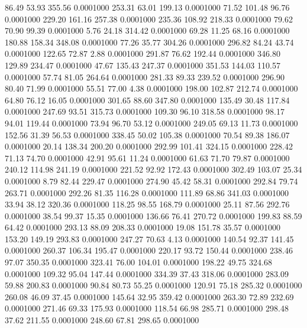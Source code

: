   86.49   53.93  355.56   0.0001000
 253.31   63.01  199.13   0.0001000
  71.52  101.48   96.76   0.0001000
 229.20  161.16  257.38   0.0001000
 235.36  108.92  218.33   0.0001000
  79.62   70.90   99.39   0.0001000
   5.76   24.18  314.42   0.0001000
  69.28   11.25   68.16   0.0001000
 180.88  158.34  348.08   0.0001000
  77.26   35.77  304.26   0.0001000
 296.82   84.24   43.74   0.0001000
 122.65   72.87    2.88   0.0001000
 291.87   76.62  192.44   0.0001000
 346.80  129.89  234.47   0.0001000
  47.67  135.43  247.37   0.0001000
 351.53  144.03  110.57   0.0001000
  57.74   81.05  264.64   0.0001000
 281.33   89.33  239.52   0.0001000
 296.90   80.40   71.99   0.0001000
  55.51   77.00    4.38   0.0001000
 198.00  102.87  212.74   0.0001000
  64.80   76.12   16.05   0.0001000
 301.65   88.60  347.80   0.0001000
 135.49   30.48  117.84   0.0001000
 247.69   93.51  315.73   0.0001000
 109.30   96.10  318.58   0.0001000
  98.17   94.01  119.44   0.0001000
  73.94   96.70   53.12   0.0001000
 249.05   69.13   11.73   0.0001000
 152.56   31.39   56.53   0.0001000
 338.45   50.02  105.38   0.0001000
  70.54   89.38  186.07   0.0001000
  20.14  138.34  200.20   0.0001000
 292.99  101.41  324.15   0.0001000
 228.42   71.13   74.70   0.0001000
  42.91   95.61   11.24   0.0001000
  61.63   71.70   79.87   0.0001000
 240.12  114.98  241.19   0.0001000
 221.52   92.92  172.43   0.0001000
 302.49  103.07   25.34   0.0001000
   8.79   82.44  229.47   0.0001000
 274.90   45.42   58.31   0.0001000
 292.84   79.74  263.71   0.0001000
 292.26   81.35  116.28   0.0001000
 111.89   68.86  341.03   0.0001000
  33.94   38.12  320.36   0.0001000
 118.25   98.55  168.79   0.0001000
  25.11   87.56  292.76   0.0001000
  38.54   99.37   15.35   0.0001000
 136.66   76.41  270.72   0.0001000
 199.83   88.59   64.42   0.0001000
 293.13   88.09  208.33   0.0001000
  19.08  151.78   35.57   0.0001000
 153.20  149.19  293.83   0.0001000
 247.27   70.63    4.13   0.0001000
 140.54   92.37  141.45   0.0001000
 260.37  106.34  195.47   0.0001000
 220.17   93.72  150.44   0.0001000
 238.46   97.07  350.35   0.0001000
 323.41   76.00  104.01   0.0001000
 198.22   49.75  324.68   0.0001000
 109.32   95.04  147.44   0.0001000
 334.39   37.43  318.06   0.0001000
 283.09   59.88  200.83   0.0001000
  90.84   80.73   55.25   0.0001000
 120.91   75.18  285.32   0.0001000
 260.08   46.09   37.45   0.0001000
 145.64   32.95  359.42   0.0001000
 263.30   72.89  232.69   0.0001000
 271.46   69.33  175.93   0.0001000
 118.54   66.98  285.71   0.0001000
 298.48   37.62  211.55   0.0001000
 248.60   67.81  298.65   0.0001000
